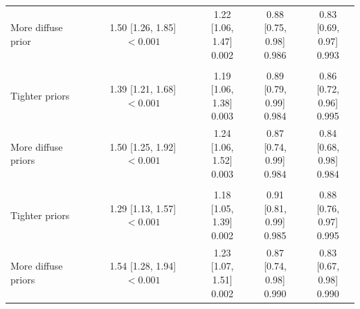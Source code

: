 \begin{tabular}[t]{lcccc}
\hspace{1em}More diffuse prior & \makecell[c]{1.50\\{[1.26, 1.85]}\\$<0.001$} & \makecell[c]{1.22\\{[1.06, 1.47]}\\0.002} & \makecell[c]{0.88\\{[0.75, 0.98]}\\0.986} & \makecell[c]{0.83\\{[0.69, 0.97]}\\0.993}\\
\addlinespace[0.3em]
\multicolumn{5}{l}{\textit{Private payoffs and item values}}\\
\hspace{1em}Tighter priors & \makecell[c]{1.39\\{[1.21, 1.68]}\\$<0.001$} & \makecell[c]{1.19\\{[1.06, 1.38]}\\0.003} & \makecell[c]{0.89\\{[0.79, 0.99]}\\0.984} & \makecell[c]{0.86\\{[0.72, 0.96]}\\0.995}\\
\hspace{1em}More diffuse priors & \makecell[c]{1.50\\{[1.25, 1.92]}\\$<0.001$} & \makecell[c]{1.24\\{[1.06, 1.52]}\\0.003} & \makecell[c]{0.87\\{[0.74, 0.99]}\\0.984} & \makecell[c]{0.84\\{[0.68, 0.98]}\\0.984}\\
\addlinespace[0.3em]
\multicolumn{5}{l}{\textit{All priors varied together}}\\
\hspace{1em}Tighter priors & \makecell[c]{1.29\\{[1.13, 1.57]}\\$<0.001$} & \makecell[c]{1.18\\{[1.05, 1.39]}\\0.002} & \makecell[c]{0.91\\{[0.81, 0.99]}\\0.985} & \makecell[c]{0.88\\{[0.76, 0.97]}\\0.995}\\
\hspace{1em}More diffuse priors & \makecell[c]{1.54\\{[1.28, 1.94]}\\$<0.001$} & \makecell[c]{1.23\\{[1.07, 1.51]}\\0.002} & \makecell[c]{0.87\\{[0.74, 0.98]}\\0.990} & \makecell[c]{0.83\\{[0.67, 0.98]}\\0.990}\\
\bottomrule
\end{tabular}
